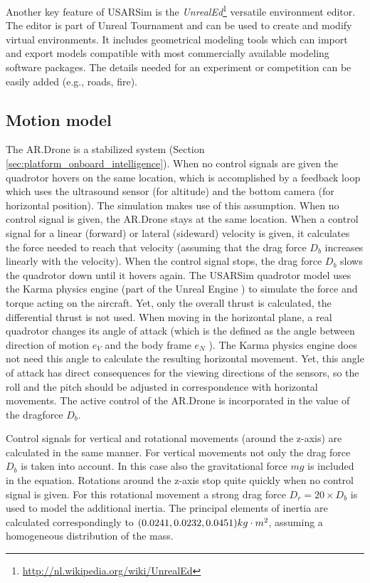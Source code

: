 Another key feature of USARSim is the \textit{UnrealEd}\footnote{\url{http://nl.wikipedia.org/wiki/UnrealEd}} versatile environment editor.
The editor is part of Unreal Tournament and can be used to create and modify virtual environments.
It includes geometrical modeling tools which can import and export models compatible with most commercially available modeling software packages.
The details needed for an experiment or competition can be easily added (e.g., roads, fire).



		\subsection{Motion model}
The AR.Drone is a stabilized system (Section \ref{sec:platform_onboard_intelligence}). When no control signals are given the quadrotor hovers on the same location, which is accomplished by a feedback loop which uses the ultrasound sensor (for altitude) and the bottom camera (for horizontal position). The simulation makes use of this assumption. When no control signal is given, the AR.Drone stays at the same location.
When a control signal for a linear (forward) or lateral (sideward) velocity is given, it calculates the force needed to reach that velocity (assuming that the drag force $D_b$ increases linearly with the velocity). When the control signal stops, the drag force $D_b$ slows the quadrotor down until it hovers again.
The USARSim quadrotor model uses the Karma physics engine (part of the Unreal Engine \cite{Carpin2006}) to simulate the force and torque acting on the aircraft. Yet, only the overall thrust is calculated, the differential thrust is not used.
When moving in the horizontal plane, a real quadrotor changes its angle of attack (which is the defined as the angle between direction of motion $e_V$ and the body frame $e_N$ \cite{Yechout2003}). 
The Karma physics engine does not need this angle to calculate the resulting horizontal movement. Yet, this angle of attack has direct consequences for the viewing directions of the sensors, so the roll and the pitch should be adjusted in correspondence with horizontal movements. The active control of the AR.Drone is incorporated in the value of the dragforce $D_b$.

Control signals for vertical and rotational movements (around the z-axis) are calculated in the same manner. For vertical movements not only the drag force $D_b$ is taken into account. In this case also the gravitational force $mg$ is included in the equation. Rotations around the z-axis stop quite quickly when no control signal is given. For this rotational movement a strong drag force $D_r = 20 \times D_b$ is used to model the additional inertia. 
The principal elements of inertia are calculated correspondingly to $(0.0241, 0.0232, 0.0451)\small{kg\cdot m^2}$, assuming a homogeneous distribution of the mass.

